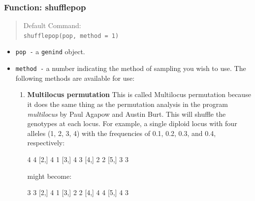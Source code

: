 \documentclass[letterpaper]{article}
\begin{document}
\subsubsection{Function: shufflepop}
\begin{quote}
Default Command:\\
\texttt{shufflepop(pop, method = 1)}
\end{quote}
\begin{itemize}
  \item \texttt{pop -} a \texttt{genind} object.
  \item \texttt{method -} a number indicating the method of sampling you wish to use. 
  The following methods are available for use:
  \begin{enumerate}
    \item \textbf{Multilocus permutation} This is called Multilocus permutation because it does the same thing as the permutation analysis in the program \textit{multilocus} by Paul Agapow and Austin Burt. \cite{Agapow:2001} This will shuffle the genotypes at each locus. For example, a single diploid locus with four alleles (1, 2, 3, 4) with the frequencies of 0.1, 0.2, 0.3, and 0.4, respectively:
\begin{Schunk}
\begin{Soutput}
     [,1] [,2]
[1,]    4    4
[2,]    4    1
[3,]    4    3
[4,]    2    2
[5,]    3    3
\end{Soutput}
\end{Schunk}
might become:
\begin{Schunk}
\begin{Soutput}
     [,1] [,2]
[1,]    3    3
[2,]    4    1
[3,]    2    2
[4,]    4    4
[5,]    4    3
\end{Soutput}
\end{Schunk}


\end{enumerate}
\end{itemize}
\end{document}
